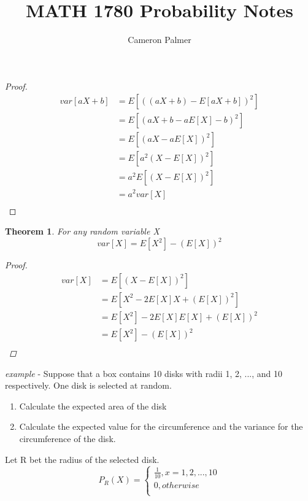 \documentclass[10pt,letterpaper]{report}
\author{Cameron Palmer}
\title{MATH 1780 Probability Notes}
\begin{document}
\begin{proof}
\begin{align*}
var[aX+b] & =E[((aX+b)-E[aX+b])^2]\\
& =E[(aX+b-aE[X]-b)^2]\\
& =E[(aX-aE[X])^2]\\
& =E[a^2(X-E[X])^2]\\
& =a^2E[(X-E[X])^2]\\
& =a^2var[X]\\
\end{align*}
\end{proof}

\theoremstyle{nonum}
\newtheorem{theorem}{Theorem}
\begin{theorem}
For any random variable X
\[var[X]=E[X^2]-(E[X])^2\]
\begin{proof}
\begin{align*}
var[X] & =E[(X-E[X])^2]\\
& =E[X^2-2E[X]X+(E[X])^2]\\
& =E[X^2]-2E[X]E[X]+(E[X])^2\\
& =E[X^2]-(E[X])^2\\
\end{align*}
\end{proof}
\end{theorem}

\emph{example} - Suppose that a box contains 10 disks with radii 1, 2, ..., and 10 respectively. One disk is selected at random.
\begin{enumerate}
\item Calculate the expected area of the disk
\item Calculate the expected value for the circumference and the variance for the circumference of the disk.
\end{enumerate}
Let R bet the radius of the selected disk.
\[ P_R(X)= \left\{ \begin{array}{l} \frac{1}{10}, x=1, 2, ..., 10\\ 0, otherwise\\ \end{array} \right. \]
\end{document}
